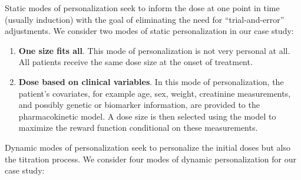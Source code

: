 Static modes of personalization seek to inform the dose at one point in time (usually induction) with the goal of eliminating the need for ``trial-and-error'' adjustments.  We consider two modes of static personalization in our case study:

\begin{enumerate}
	\item \textbf{One size fits all}.  This mode of personalization is not very personal at all.  All patients receive the same dose size at the onset of treatment.
	\item \textbf{Dose based on clinical variables}.  In this mode of personalization, the patient's covariates, for example age, sex, weight, creatinine measurements, and possibly genetic or biomarker information, are provided to the pharmacokinetic model.  A dose size is then selected using the model to maximize the reward function conditional on these measurements.
\end{enumerate}

\noindent Dynamic modes of personalization seek to personalize the initial doses but also the titration process.  We consider four modes of dynamic personalization for our case study:

